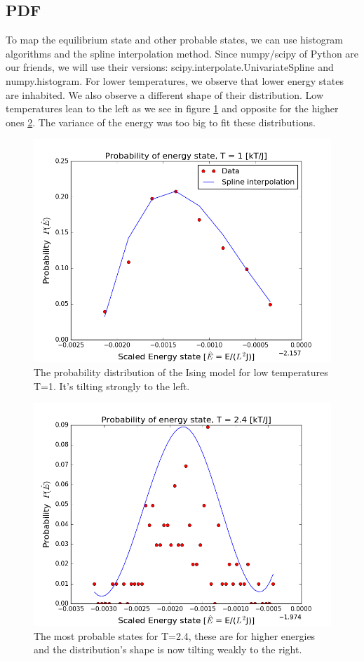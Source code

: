 \documentclass[%
oneside,                 %
final,                   %
10pt]{article}
\begin{document}
\subsection{PDF}
To map the equilibrium state and other probable states, we can use histogram algorithms and the spline interpolation method.
Since numpy/scipy of Python are our friends, we will use their versions: scipy.interpolate.UnivariateSpline and numpy.histogram.
For lower temperatures, we observe that lower energy states are inhabited. We also observe a different shape of their distribution.
Low temperatures lean to the left as we see in figure \ref{low} and opposite for the higher ones \ref{high}. The variance of the energy was too big to fit these distributions. 
\begin{figure}
\includegraphics[scale=0.5]{bestfitt1}
\caption{The probability distribution of the Ising model for low temperatures T=1. It's tilting strongly to the left.}
\label{low}
\end{figure}
\begin{figure}
\includegraphics[scale=0.5]{bestfitt2} 
\caption{The most probable states for T=2.4, these are for higher energies and the distribution's shape is now tilting weakly to the right.}
\label{high}
\end{figure}
\end{document}
